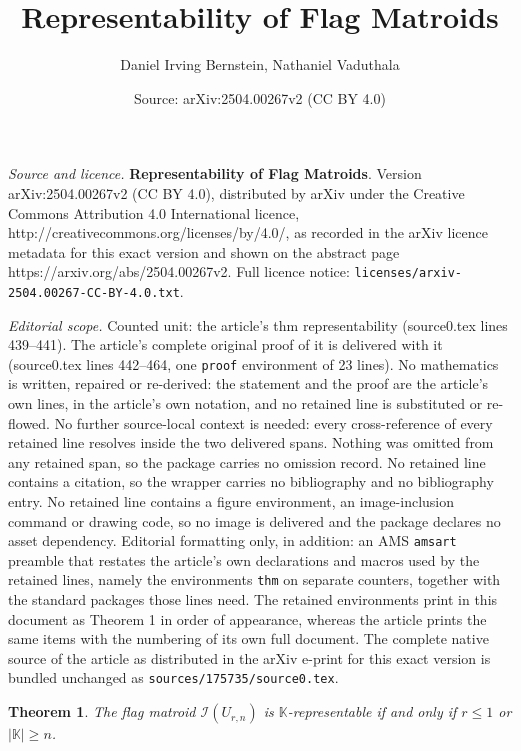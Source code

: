 \documentclass[10pt,a4paper]{amsart}
\title{\textbf{Representability of Flag Matroids}}
\author{Daniel Irving Bernstein, Nathaniel Vaduthala}
\date{Source: arXiv:2504.00267v2 (CC BY 4.0)}
\newtheorem{thm}{Theorem}
\begin{document}
\maketitle

\noindent\emph{Source and licence.} \textbf{Representability of Flag Matroids}. Version arXiv:2504.00267v2 (CC BY 4.0), distributed by arXiv under the Creative Commons Attribution 4.0 International licence, http://creativecommons.org/licenses/by/4.0/, as recorded in the arXiv licence metadata for this exact version and shown on the abstract page https://arxiv.org/abs/2504.00267v2. Full licence notice: \texttt{licenses/arxiv-2504.00267-CC-BY-4.0.txt}.\par\smallskip

\noindent\textit{Editorial scope.} Counted unit: the article's thm representability (source0.tex lines 439--441). The article's complete original proof of it is delivered with it (source0.tex lines 442--464, one \texttt{proof} environment of 23 lines). No mathematics is written, repaired or re-derived: the statement and the proof are the article's own lines, in the article's own notation, and no retained line is substituted or re-flowed.  No further source-local context is needed: every cross-reference of every retained line resolves inside the two delivered spans.  Nothing was omitted from any retained span, so the package carries no omission record.  No retained line contains a citation, so the wrapper carries no bibliography and no bibliography entry.  No retained line contains a figure environment, an image-inclusion command or drawing code, so no image is delivered and the package declares no asset dependency.  Editorial formatting only, in addition: an AMS \texttt{amsart} preamble that restates the article's own declarations and macros used by the retained lines, namely the environments \texttt{thm} on separate counters, together with the standard packages those lines need.  The retained environments print in this document as Theorem 1 in order of appearance, whereas the article prints the same items with the numbering of its own full document.  The complete native source of the article as distributed in the arXiv e-print for this exact version is bundled unchanged as \texttt{sources/175735/source0.tex}.
\begin{thm}\label{thm: uniform flag matroids representability}
    The flag matroid $\mathcal{I}(U_{r,n})$ is $\mathbb{K}$-representable if and only if $r\leq 1$ or $|\mathbb{K}| \geq n$.
\end{thm}
\end{document}
